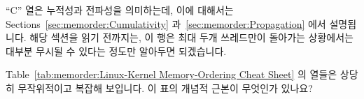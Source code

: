 ``C'' 열은 누적성과 전파성을 의미하는데, 이에 대해서는
Sections~\ref{sec:memorder:Cumulativity}
과~\ref{sec:memorder:Propagation} 에서 설명됩니다.
해당 섹션을 읽기 전까지는, 이 행은 최대 두개 쓰레드만이 돌아가는 상황에서는
대부분 무시될 수 있다는 정도만 알아두면 되겠습니다.

\QuickQuiz{}
	Table~\ref{tab:memorder:Linux-Kernel Memory-Ordering Cheat Sheet}
	의 열들은 상당히 무작위적이고 복잡해 보입니다.
	이 표의 개념적 근본이 무엇인가 있나요?

